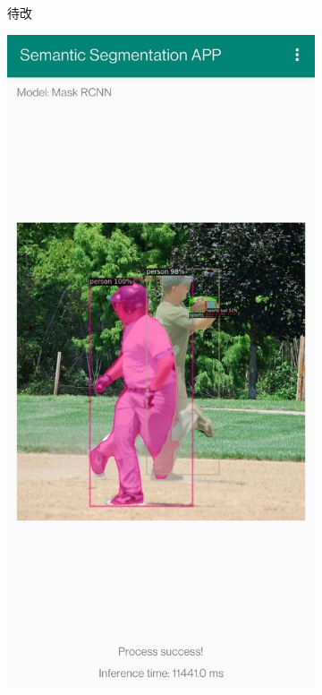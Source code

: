 \begin{figure}[htbp]
\begin{subfigure}[t]{0.3\linewidth}
        \caption{待改}\label{resultpaddle}
    \end{subfigure}
    \begin{subfigure}[t]{0.3\linewidth}
        \includegraphics[width=1\textwidth]{figures/maskresult.jpg}

\end{subfigure}
\end{figure}

